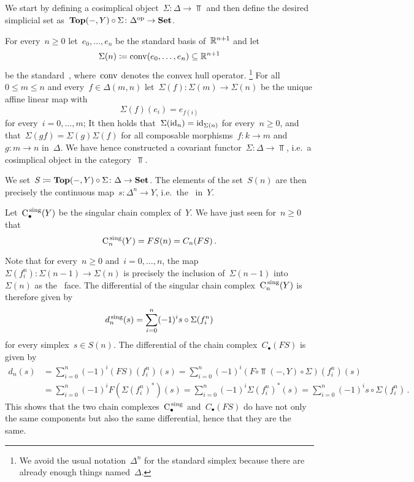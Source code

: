 \subsection{}

We start by defining a cosimplical object~$\Sigma \colon \Delta \to \Top$ and then define the desired simplicial set as~$\mathbf{Top}(-,Y) \circ \Sigma \colon \Delta^{\mathrm{op}} \to \mathbf{Set}$.

For every~$n \geq 0$ let~$e_0, \dotsc, e_n$ be the standard basis of~$\mathbb{R}^{n+1}$ and let
\[
  \Sigma (n)
  \coloneqq
  \operatorname{conv}(e_0, \dotsc, e_n)
  \subseteq
  \mathbb{R}^{n+1}
\]
be the standard~, where~$\operatorname{conv}$ denotes the convex hull operator.%
\footnote{We avoid the usual notation~$\Delta^n$ for the standard simplex because there are already enough things named~$\Delta$.}
For all~$0 \leq m \leq n$ and every~$f \in \Delta(m,n)$ let~$\Sigma(f) \colon \Sigma(m) \to \Sigma(n)$ be the unique affine linear map with
\[
    \Sigma(f)(e_i)
  = e_{f(i)}
\]
for every~$i = 0, \dotsc, m$;
It then holds that~$\Sigma(\operatorname{id}_n) = \operatorname{id}_{\Sigma(n)}$ for every~$n \geq 0$, and that~$\Sigma(gf) = \Sigma(g) \Sigma(f)$ for all composable morphisms~$f \colon k \to m$ and~$g \colon m \to n$ in~$\Delta$.
We have hence constructed a covariant functor~$\Sigma \colon \Delta \to \Top$, i.e.\ a cosimplical object in the category~$\Top$.

We set~$S \coloneqq \mathbf{Top}(-,Y) \circ \Sigma \colon \Delta \to \mathbf{Set}$.
The elements of the set~$S(n)$ are then precisely the continuous map~$s \colon \Delta^n \to Y$, i.e.\ the~ in~$Y$.

Let~$\operatorname{C}^{\,\mathrm{sing}}_\bullet(Y)$ be the singular chain complex of~$Y$.
We have just seen for~$n \geq 0$ that
\[
    \operatorname{C}^{\,\mathrm{sing}}_n(Y)
  = FS(n)
  = C_n(FS) \,.
\]

Note that for every~$n \geq 0$ and~$i = 0, \dotsc, n$, the map~$\Sigma(f^n_i) \colon \Sigma(n-1) \to \Sigma(n)$ is precisely the inclusion of~$\Sigma(n-1)$ into~$\Sigma(n)$ as the~ face.
The differential of the singular chain complex~$\operatorname{C}^{\,\mathrm{sing}}_n(Y)$ is therefore given by
\[
    d^{\,\mathrm{sing}}_n(s)
  = \sum_{i=0}^n (-1)^i s \circ \Sigma(f^n_i)
\]
for every simplex~$s \in S(n)$.
The differential of the chain complex~$C_\bullet(FS)$ is given by
\begin{align*}
      d_n(s)
  &=  \sum_{i=0}^n (-1)^i (FS)(f^n_i)(s)
   =  \sum_{i=0}^n (-1)^i (F \circ \Top(-,Y) \circ \Sigma)(f^n_i)(s)  \\
  &=  \sum_{i=0}^n (-1)^i F( \Sigma(f^n_i)^* )(s)
   =  \sum_{i=0}^n (-1)^i \Sigma(f^n_i)^*(s)
   =  \sum_{i=0}^n (-1)^i s \circ \Sigma(f^n_i) \,.
\end{align*}
This shows that the two chain complexes~$\operatorname{C}^{\,\mathrm{sing}}_\bullet$ and~$C_\bullet(FS)$ do have not only the same components but also the same differential, hence that they are the same.


